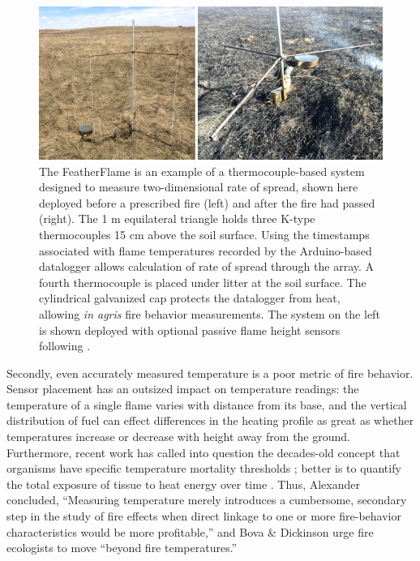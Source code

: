 \documentclass[fire,article,submit,oneauthor,pdftex]{Definitions/mdpi}
\begin{document}
\begin{figure}[t]
	\centering
	\includegraphics[width=1\columnwidth]{FeatherFlame.pdf}
	\caption{The FeatherFlame is an example of a thermocouple-based system designed to measure two-dimensional rate of spread, shown here deployed before a prescribed fire (left) and after the fire had passed (right). 
		The 1 m equilateral triangle holds three K-type thermocouples 15 cm above the soil surface. 
		Using the timestamps associated with flame temperatures recorded by the Arduino-based datalogger allows calculation of rate of spread through the array. 
		A fourth thermocouple is placed under litter at the soil surface. 
		The cylindrical galvanized cap protects the datalogger from heat, allowing \emph{in agris} fire behavior measurements.
	The system on the left is shown deployed with optional passive flame height sensors following \cite{finney1992}.   }
	\label{Fig:FeatherFlame} %
\end{figure}

Secondly, even accurately measured temperature is a poor metric of fire behavior. 
Sensor placement has an outsized impact on temperature readings: the temperature of a single flame varies with distance from its base, and the vertical distribution of fuel can effect differences in the heating profile as great as whether temperatures increase or decrease with height away from the ground. 
Furthermore, recent work has called into question the decades-old concept that organisms have specific temperature mortality thresholds \cite{smith2016, pingree2019}; better is to quantify the total exposure of tissue to heat energy over time \cite{wright1970, dickinson2004, bova2005}.
Thus, Alexander \cite[][p. 350]{alexander1982} concluded, ``Measuring temperature merely introduces a cumbersome, secondary step in the study of fire effects when direct linkage to one or more fire-behavior characteristics would be more profitable,'' and Bova \& Dickinson \cite{bova2008} urge fire ecologists to move ``beyond fire temperatures.''
\end{document}
